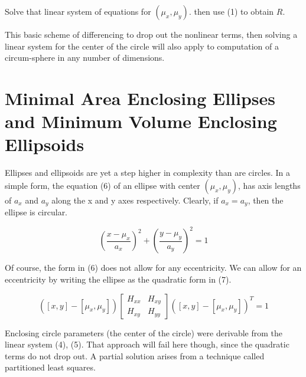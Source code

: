 \documentclass[a4paper,11pt]{article}
\begin{document}
Solve that linear system of equations for $(\mu_x,\mu_y)$. then use (1) to obtain $R$.

This basic scheme of differencing to drop out the nonlinear terms, then solving a linear
system for the center of the circle will also apply to computation of a circum-sphere in
any number of dimensions.

\bigskip


\bigskip

\section{Minimal Area Enclosing Ellipses and Minimum Volume Enclosing Ellipsoids}

Ellipses and ellipsoids are yet a step higher in complexity than are circles. In a simple form,
the equation (6) of an ellipse with center $(\mu_x,\mu_y)$, has axis lengths of $a_x$ and $a_y$
along the x and y axes respectively. Clearly, if $a_x = a_y$, then the ellipse is circular.

\begin{equation} \tag{6}
(\frac{x-\mu_x}{a_x})^2 + (\frac{y - \mu_y}{a_y})^2 = 1
\end{equation}

Of course, the form in (6) does not allow for any eccentricity. We can allow for an eccentricity
by writing the ellipse as the quadratic form in (7).

\begin{equation} \tag{7}
([x,y] - [\mu_x,\mu_y])
\begin{bmatrix} H_{xx} & H_{xy}  \\ H_{xy} & H_{yy} \end{bmatrix}
([x,y] - [\mu_x,\mu_y])^T = 1
\end{equation}

Enclosing circle parameters (the center of the circle) were derivable from the linear system
{(4), (5)}. That approach will fail here though, since the quadratic terms do not drop out. A
partial solution arises from a technique called partitioned least squares. 
\end{document}
